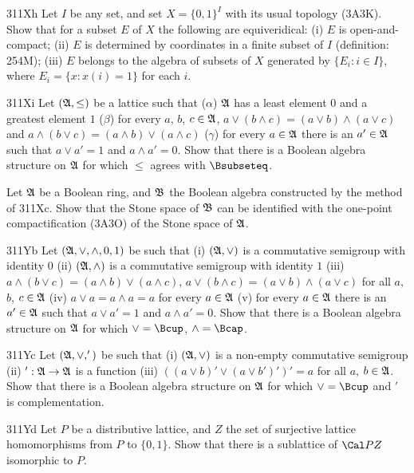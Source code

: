 {\spheader 311Xh Let $I$ be any set, and set $X=\{0,1\}^I$ with its usual 
topology (3A3K).   Show that for a subset $E$ of $X$ the following are 
equiveridical:  (i) $E$ is open-and-compact;  (ii) $E$ is determined by 
coordinates in a finite subset of $I$ (definition:  254M);  (iii) $E$ 
belongs to the algebra of subsets of $X$ generated by $\{E_i:i\in I\}$, 
where $E_i=\{x:x(i)=1\}$ for each $i$. 
 
\spheader 311Xi Let $(\frak A,\le)$ be a lattice such that ($\alpha$) 
$\frak A$ has a least element $0$ and a greatest element $1$ ($\beta$) 
for every $a$, $b$, $c\in\frak A$, $a\vee(b\wedge c)=(a\vee 
b)\wedge(a\vee c)$ and $a\wedge(b\vee c)=(a\wedge b)\vee(a\wedge c)$ 
($\gamma$) for every $a\in\frak A$ there is an $a'\in\frak A$ such that 
$a\vee a'=1$ and $a\wedge a'=0$.   Show that there is a Boolean algebra 
structure on $\frak A$ for which $\le$ agrees with $\Bsubseteq$. 
 
 Let $\frak A$ be a Boolean ring, 
and $\frak B$ the Boolean algebra constructed by the method of 311Xc. 
Show that the Stone space of $\frak B$ can be identified with the 
one-point compactification (3A3O) of the Stone space of $\frak A$. 
 
\spheader 311Yb Let $(\frak A,\vee,\wedge,0,1)$ be such that (i) 
$(\frak A,\vee)$ is a commutative semigroup with identity $0$ (ii) 
$(\frak A,\wedge)$ is a commutative semigroup with identity $1$ (iii) 
$a\wedge(b\vee c)=(a\wedge b)\vee(a\wedge c)$, 
$a\vee(b\wedge c)=(a\vee b)\wedge(a\vee c)$ for all $a$, $b$, 
$c\in\frak A$ (iv) $a\vee a=a\wedge a=a$ for every $a\in\frak A$ 
(v) for every $a\in\frak A$ there is an 
$a'\in\frak A$ such that $a\vee a'=1$ and $a\wedge a'=0$.   Show that there 
is a Boolean algebra structure on $\frak A$ for which $\vee=\Bcup$, 
$\wedge=\Bcap$. 

\spheader 311Yc Let $(\frak A,\vee,')$ be such that (i) 
$(\frak A,\vee)$ is a 
non-empty commutative semigroup (ii) $':\frak A\to\frak A$ is
a function (iii) $((a\vee b)'\vee(a\vee b')')'=a$ for all $a$,
$b\in\frak A$.
Show that there is a Boolean algebra structure on $\frak A$ for which
$\vee=\Bcup$ and $'$ is complementation.

\spheader 311Yd Let $P$ be a distributive lattice, and $Z$ the
set of surjective lattice homomorphisms from $P$ to $\{0,1\}$.   Show that
there is a sublattice of $\Cal PZ$ isomorphic to $P$.
}%
 

